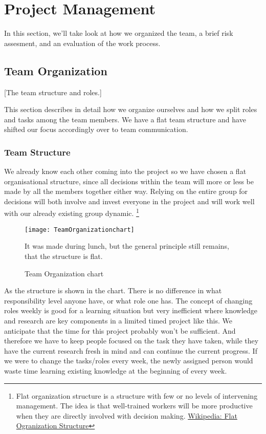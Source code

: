 \section{Project Management}\label{management} 
    In this section, we'll take look at how we organized the team, a brief risk assesment, and an evaluation of the work process. 
    
    \subsection{Team Organization}\label{team} 
        [The team structure and roles.]
        
        This section describes in detail how we organize ourselves and how we split roles and tasks among the team members. We have a flat team structure and have shifted our focus accordingly over to team communication. 
    
    \subsubsection{Team Structure}
    We already know each other coming into the project so we have chosen a flat organisational structure, since all decisions within the team will more or less be made by all the members together either way. Relying on the entire group for decisions will both involve and invest everyone in the project and will work well with our already existing group dynamic.
    \footnote{
        Flat organization structure is a structure with few or no levels of intervening management. The idea is that well-trained workers will be more productive when they are directly involved with decision making. 
        \href{http://en.wikipedia.org/wiki/Flat_organization}{Wikipedia: Flat Ogranization Structure} 
    }
    
    \begin{figure}[h]
        \centering
        \texttt{[image: TeamOrganizationchart]}
        \caption{Team Organization chart}
        It was made during lunch, but the general principle still remains, that the structure is flat.
        \label{fig:teamOrgchart}
    \end{figure}
    
    
    As the structure is shown in the chart. There is no difference in what responsibility level anyone have, or what role one has. The concept of changing roles weekly is good for a learning situation but very inefficient where knowledge and research are key components in a limited timed project like this. We anticipate that the time for this project probably won't be sufficient. And therefore we have to keep people focused on the task they have taken, while they have the current research fresh in mind and can continue the current progress. If we were to change the tasks/roles every week, the newly assigned person would waste time learning existing knowledge at the beginning of every week.


